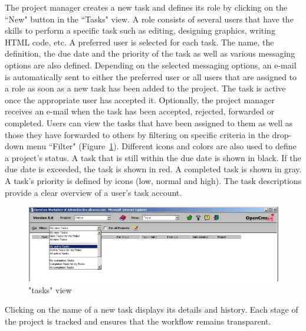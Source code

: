 The project manager creates a new task and defines its role by
clicking on the ``New" button in the ``Tasks" view. A role consists
of several users that have the skills to perform a specific task
such as editing, designing graphics, writing HTML code, etc. A
preferred user is selected for each task. The name, the
definition, the due date and the priority of the task as well as
various messaging options are also defined. Depending on the
selected messaging options, an e-mail is automatically sent to
either the preferred user or all users that are assigned to a role
as soon as a new task has been added to the project. The task is
active once the appropriate user has accepted it. Optionally, the
project manager receives an e-mail when the task has been
accepted, rejected, forwarded or completed. Users can view the
tasks that have been assigned to them as well as those they have
forwarded to others by filtering on specific criteria in the
drop-down menu ``Filter" (Figure~\ref{taskview}). Different icons
and colors are also used to define a project's status. A task that
is still within the due date is shown in black. If the due date is
exceeded, the task is shown in red. A completed task is shown in
gray. A task's priority is defined by icons (low, normal and
high). The task descriptions provide a clear overview of a user's
task account.

\begin{figure}[!hbt]
\begin{center}
\includegraphics[width=\sgw]
                   {pics/usermanual/taskView}
\caption["tasks" view]
           {"tasks" view}
\label{taskview}
\end{center}
\end{figure}

Clicking on the name of a new task displays its details and
history. Each stage of the project is tracked and ensures that the
workflow remains transparent.
